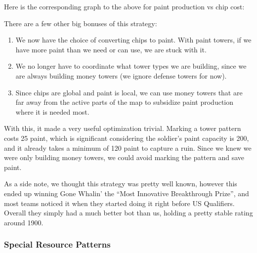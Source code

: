\medskip

Here is the corresponding graph to the above for paint production vs chip cost:
\begin{center}
\end{center}
There are a few other big bonuses of this strategy:
\begin{enumerate}
  \item We now have the choice of converting chips to paint. With paint towers, if we have more paint than we need or can use, we are stuck with it.
  \item We no longer have to coordinate what tower types we are building, since we are always building money towers (we ignore defense towers for now).
  \item Since chips are global and paint is local, we can use money towers that are far away from the active parts of the map to subsidize paint production where it is needed most.
\end{enumerate}
With this, it made a very useful optimization trivial. Marking a tower pattern costs 25 paint, which is significant considering the soldier's paint capacity is 200, and it already takes a minimum of 120 paint to capture a ruin. Since we knew we were only building money towers, we could avoid marking the pattern and save paint.

\medskip

As a side note, we thought this strategy was pretty well known, however this ended up winning Gone Whalin' the ``Most Innovative Breakthrough Prize'', and most teams noticed it when they started doing it right before US Qualifiers. Overall they simply had a much better bot than us, holding a pretty stable rating around 1900.

\subsubsection{Special Resource Patterns}

